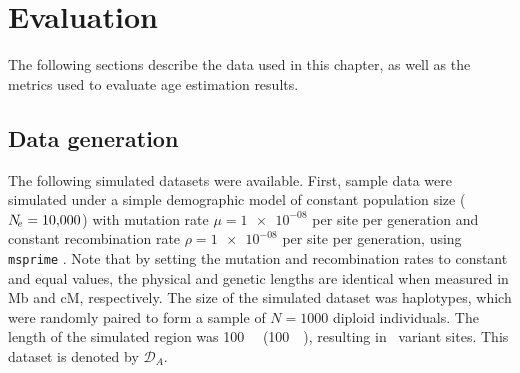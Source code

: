 %
%
%










%
\section{Evaluation}
%


The following sections describe the data used in this chapter, as well as the metrics used to evaluate age estimation results.



%
\subsection{Data generation}
%

The following simulated datasets were available.
First, sample data were simulated under a simple demographic model of constant population size (${N_{\!e} = \num{10000}}$) with mutation rate ${\mu=\num[round-precision=1]{1e-08}}$ per site per generation and constant recombination rate ${\rho=\num[round-precision=1]{1e-08}}$ per site per generation, using \texttt{msprime} \citep{Kelleher:2016fn}.
Note that by setting the mutation and recombination rates to constant and equal values, the physical and genetic lengths are identical when measured in \gls{Mb} and \gls{cM}, respectively.
The size of the simulated dataset was  haplotypes, which were randomly paired to form a sample of ${N=\num{1000}}$ diploid individuals.
The length of the simulated region was \SI{100}{\mega\basepair} (\SI{100}{\centi\morgan}), resulting in ~variant sites.
This dataset is denoted by $\mathcal{D}_A$.

